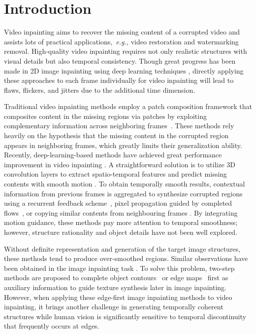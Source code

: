 

\section{Introduction}


Video inpainting aims to recover the missing content of a corrupted video and assists lots of practical applications,~\emph{e.g.,} video restoration and watermarking removal. 
High-quality video inpainting requires not only realistic structures with visual details but also temporal consistency. 
Though great progress has been made in 2D image inpainting using deep learning techniques \cite{yu2018free,Xiong_2019_CVPR,wang2018high}, directly applying these approaches to each frame individually for video inpainting will lead to flaws, flickers, and jitters due to the additional time dimension. 



Traditional video inpainting methods employ a patch composition framework that composites content in the missing regions via patches by exploiting complementary information across neighboring frames~\cite{patwardhan2007video,wexler2004space,newson2014video}.
% 
These methods rely heavily on the hypothesis that the missing content in the corrupted region appears in neighboring frames, which greatly limits their generalization ability.
%
Recently, deep-learning-based methods have achieved great performance improvement in video inpainting \cite{wang2019video,Kim_2019_CVPR1,Xu_2019_CVPR,Kim_2019_CVPR,lee2019copy,oh2019onion}.
A straightforward solution is to utilize 3D convolution layers to extract spatio-temporal features and predict missing contents with smooth motion \cite{wang2019video}.
To obtain temporally smooth results, contextual information from previous frames is aggregated to synthesize corrupted regions using a recurrent feedback scheme~\cite{Kim_2019_CVPR1,Kim_2019_CVPR}, pixel propagation guided by completed flows~\cite{Xu_2019_CVPR}, 
or copying similar contents from neighbouring frames \cite{lee2019copy,oh2019onion}.
By integrating motion guidance, these methods pay more attention to temporal smoothness; however, structure rationality and object details have not been well explored. 


Without definite representation and generation of the target image structures, these methods tend to produce over-smoothed regions. 
Similar observations have been obtained in the image inpainting task \cite{Xiong_2019_CVPR,nazeri2019edgeconnect}.
To solve this problem, two-step methods are proposed to complete object contours~\cite{Xiong_2019_CVPR} or edge maps~\cite{nazeri2019edgeconnect} first as auxiliary information to guide texture synthesis later in image inpainting.
%
However, when applying these edge-first image inpainting methods to video inpainting, it brings another challenge in generating temporally coherent structures while human vision is significantly sensitive to temporal discontinuity that frequently occurs at edges. 


